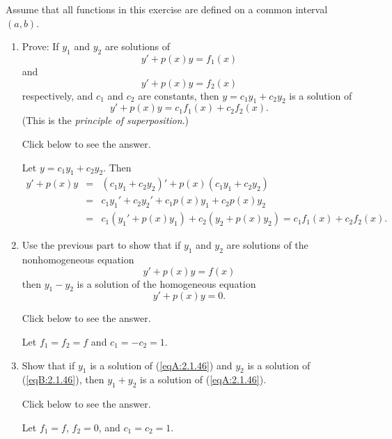 \documentclass{ximera}
\begin{document}
\begin{problem}\label{exer:2.1.46}
Assume that all functions in this exercise are defined on
a common interval $(a,b)$.
\begin{enumerate}
\item %
Prove:  If $y_1$ and $y_2$ are solutions of
$$
y'+p(x)y=f_1(x)
$$
and
$$
y'+p(x)y=f_2(x)
$$
respectively, and $c_1$ and $c_2$ are constants, then
$y=c_1y_1+c_2y_2$ is a solution of
$$
y'+p(x)y=c_1f_1(x)+c_2f_2(x).
$$
(This is the \emph{principle of superposition}.)

Click below to see the answer.

\begin{expandable}
    Let $y=c_1y_1+c_2y_2$. Then
\begin{eqnarray*}
y'+p(x)y&=&(c_1y_1+c_2y_2)'+p(x)(c_1y_1+c_2y_2)\\
&=&c_1y_1'+c_2y_2'+c_1p(x)y_1+c_2p(x)y_2\\
&=&c_1(y_1'+p(x)y_1)+c_2(y_2+p(x)y_2)=c_1f_1(x)+c_2f_2(x).
\end{eqnarray*}
\end{expandable}

\item %
Use the previous part to show that if $y_1$ and $y_2$ are solutions
of the nonhomogeneous equation
\begin{equation}\label{eqA:2.1.46}
y'+p(x)y=f(x)
\end{equation}
then $y_1-y_2$ is a solution of the homogeneous equation
\begin{equation}\label{eqB:2.1.46}
y'+p(x)y=0.
\end{equation}

Click below to see the answer.

\begin{expandable}
    Let $f_1=f_2=f$ and $c_1=-c_2=1$.
\end{expandable}

\item %
Show that if $y_1$ is a solution of
(\ref{eqA:2.1.46}) and $y_2$ is a solution of
(\ref{eqB:2.1.46}), then $y_1+y_2$ is a solution of
(\ref{eqA:2.1.46}).

Click below to see the answer.

\begin{expandable}
    Let $f_1=f$, $f_2=0$, and $c_1=c_2=1$.
\end{expandable}
\end{enumerate}
\end{problem}
\end{document}
